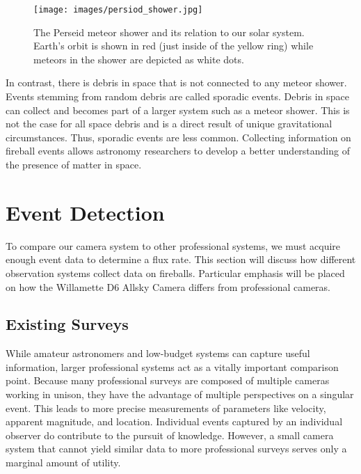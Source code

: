 \begin{figure}[ht!]
  \centering
  \texttt{[image: images/persiod\_shower.jpg]}
  \caption[The Perseid meteor shower and its relation to our solar system.]{The Perseid meteor shower and its relation to our solar system.  Earth's orbit is shown in red (just inside of the yellow ring) while meteors in the shower are depicted as white dots.}
  \label{perceid}
\end{figure}

In contrast, there is debris in space that is not connected to any meteor shower. 
Events stemming from random debris are called sporadic events.
Debris in space can collect and becomes part of a larger system such as a meteor shower.
This is not the case for all space debris and is a direct result of unique gravitational circumstances.
Thus, sporadic events are less common.
Collecting information on fireball events allows astronomy researchers to develop a better understanding of the presence of matter in space. 

\section{Event Detection}

To compare our camera system to other professional systems, we must acquire enough event data to determine a flux rate.  
This section will discuss how different observation systems collect data on fireballs.
Particular emphasis will be placed on how the Willamette D6 Allsky Camera differs from professional cameras.


\subsection{Existing Surveys}
While amateur astronomers and low-budget systems can capture useful information, larger professional systems act as a vitally important comparison point.
Because many professional surveys are composed of multiple cameras working in unison, they have the advantage of multiple perspectives on a singular event.
This leads to more precise measurements of parameters like velocity, apparent magnitude, and location.
Individual events captured by an individual observer do contribute to the pursuit of knowledge.
However, a small camera system that cannot yield similar data to more professional surveys serves only a marginal amount of utility.

